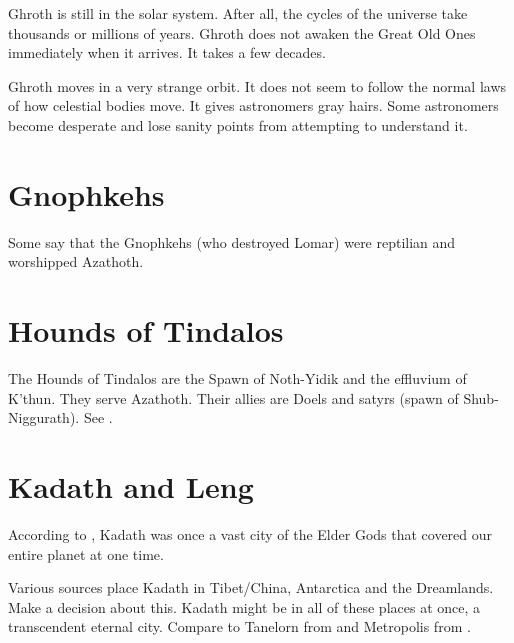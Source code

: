 \documentclass[a4paper,12pt,openany,oneside]{book}
\begin{document}
Ghroth is still in the solar system. 
After all, the cycles of the universe take thousands or millions of years. 
Ghroth does not awaken the Great Old Ones immediately when it arrives. 
It takes a few decades. 

Ghroth moves in a very strange orbit. 
It does not seem to follow the normal laws of how celestial bodies move.
It gives astronomers gray hairs. 
Some astronomers become desperate and lose sanity points from attempting to understand it. 















\section{Gnophkehs}
Some say that the Gnophkehs (who destroyed Lomar) were reptilian and worshipped Azathoth.















\section{Hounds of Tindalos}
The Hounds of Tindalos are the Spawn of Noth-Yidik and the effluvium of K'thun.
They serve Azathoth. 
Their allies are Doels and satyrs (spawn of Shub-Niggurath).
See \cite{LinCarter:TheMadnessOutofTime}.















\section{Kadath and Leng}
According to \cite{DanielHarms:TheCthulhuMythosEncyclopedia}, Kadath was once a vast city of the Elder Gods that covered our entire planet at one time. 

Various sources place Kadath in Tibet/China, Antarctica and the Dreamlands. 
Make a decision about this.
Kadath might be in all of these places at once, a transcendent eternal city.
Compare to Tanelorn from \cite{MichaelMoorcock:ElricofMelnibone} and Metropolis from \cite{RPG:Kult}. 
\end{document}
